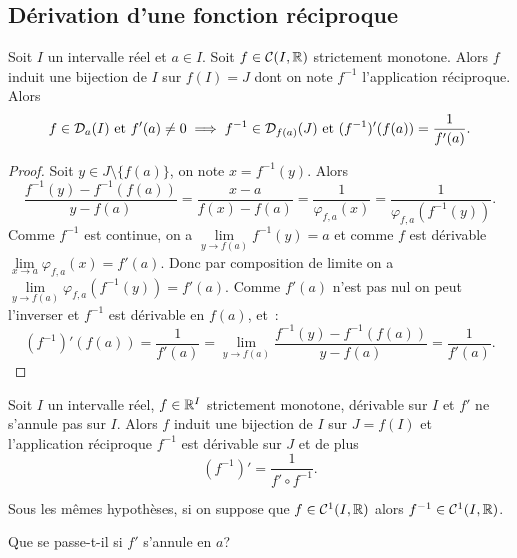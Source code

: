 \subsection{Dérivation d'une fonction réciproque}

\begin{theo}
  Soit \(I\) un intervalle réel et \(a \in I\). Soit \(f \in \mathcal{C}(I,\mathbb{R})\) strictement monotone. Alors \(f\) induit une bijection de \(I\) sur \(f(I)=J\) dont on note \(f^{-1}\) l'application réciproque. Alors
  \begin{equation}
    f \in \mathcal{D}_{a}(I) \text{~et~} f'(a) \neq 0 \implies f^{-1} \in \mathcal{D}_{f(a)}(J) \text{~et~} (f^{-1})'(f(a))=\frac{1}{f'(a)}.
  \end{equation}
\end{theo}
\begin{proof}
  Soit \(y \in J \setminus \{f(a)\}\), on note \(x=f^{-1}(y)\). Alors
  \begin{equation}
    \frac{f^{-1}(y)-f^{-1}(f(a))}{y-f(a)}=\frac{x-a}{f(x)-f(a)} = \frac{1}{\varphi_{f,a}(x)}=\frac{1}{\varphi_{f,a}(f^{-1}(y))}.
  \end{equation}
  Comme \(f^{-1}\) est continue, on a \(\lim\limits_{y \to f(a)}f^{-1}(y) = a\) et comme \(f\) est dérivable \(\lim\limits_{x \to a} \varphi_{f,a}(x)=f'(a)\). Donc par composition de limite on a \(\lim\limits_{y \to f(a)}\varphi_{f,a}(f^{-1}(y))=f'(a)\). Comme \(f'(a)\) n'est pas nul on peut l'inverser et \(f^{-1}\) est dérivable en \(f(a)\), et~:
  \begin{equation}
    (f^{-1})'(f(a))=\frac{1}{f'(a)} = \lim\limits_{y \to f(a)} \frac{f^{-1}(y)-f^{-1}(f(a))}{y-f(a)} = \frac{1}{f'(a)}.
  \end{equation}
\end{proof}
\begin{corth}
  Soit \(I\) un intervalle réel, \(f \in \mathbb{R}^I\) strictement monotone, dérivable sur \(I\) et \(f'\) ne s'annule pas sur \(I\). Alors \(f\) induit une bijection de \(I\) sur \(J=f(I)\) et l'application réciproque \(f^{-1}\) est dérivable sur \(J\) et de plus
  \begin{equation}
    (f^{-1})'=\frac{1}{f' \circ f^{-1}}.
  \end{equation}
\end{corth}
\begin{corth}
  Sous les mêmes hypothèses, si on suppose que \(f \in \mathcal{C}^{1}(I,\mathbb{R})\) alors \(f^{-1} \in \mathcal{C}^{1}(I,\mathbb{R})\).
\end{corth}

Que se passe-t-il si \(f'\) s'annule en \(a\)?


